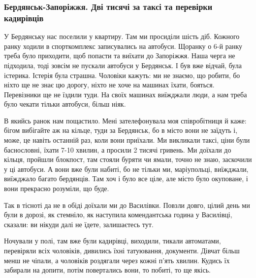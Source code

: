  
 
 
 
 

\subsubsection{Бердянськ-Запоріжжя. Дві тисячі за таксі та перевірки кадирівців}

У Бердянську нас поселили у квартиру. Там ми просиділи шість діб. Кожного ранку
ходили в спорткомплекс записувались на автобуси. Щоранку о 6-й ранку треба було
приходити, щоб попасти та виїхати до Запоріжжя. Наша черга не підходила, тоді
зовсім не пускали автобуси у Бердянськ. І був вже відчай, була істерика.
Істерія була страшна. Чоловіки кажуть: ми не знаємо, що робити, бо ніхто ще не
знає цю дорогу, ніхто не хоче на машинах їхати, бояться. Перевізники ще не
їздили туди. На своїх машинах виїжджали люди, а нам треба було чекати тільки
автобуси, більш ніяк.


В якийсь ранок нам пощастило. Мені зателефонувала моя співробітниця й каже:
бігом вибігайте аж на кільце, туди за Бердянськ, бо в місто вони не заїдуть і,
може, це навіть останній раз, коли вони приїхали. Ми викликали таксі, ціни були
баснословні, їхати 7-10 хвилин, а просили 2 тисячі гривень. Ми доїхали до
кільця, пройшли блокпост, там стояли буряти чи ямали, точно не знаю, заскочили
у ці автобуси. А вони вже були набиті, бо не тільки ми, маріупольці, виїжджали,
виїжджало багато бердянців. Там хоч і було все ціле, але місто було окуповане,
і вони прекрасно розуміли, що буде.

Так в тісноті да не в обіді доїхали ми до Василівки. Повзли довго, цілий день
ми були в дорозі, як стемніло, як наступила комендантська година у Василівці,
сказали: ви нікуди далі не їдете, залишаєтесь тут.

\begin{qqquote}
Ночували у полі, там вже були кадирівці, виходили, тикали автоматами,
перевіряли всіх чоловіків, дивились їхні татуювання, документи. Дівчат більш
менш не чіпали, а чоловіків роздягали через кожні п'ять хвилин. Кудись їх
забирали на допити, потім повертались вони, то побиті, то ще якісь.	
\end{qqquote}

